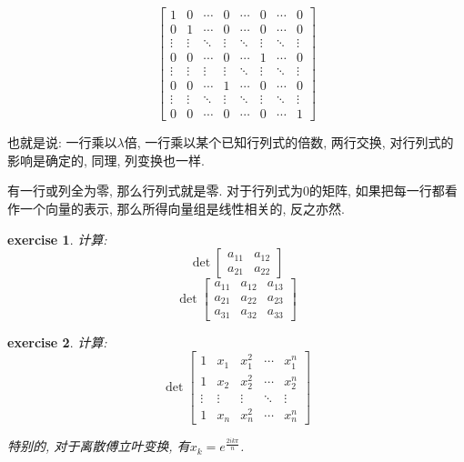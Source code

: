 \documentclass[12pt]{ctexbook}
\numberwithin{definition}{section}
\numberwithin{theorem}{section}
\newtheorem{exercise}{exercise}
\numberwithin{exercise}{section}
\numberwithin{example}{section}
\numberwithin{lemma}{section}
\begin{document}
    \begin{equation}
        \begin{bmatrix}
            1 & 0 & \cdots & 0 & \cdots & 0 & \cdots & 0 \\
            0 & 1 & \cdots & 0 & \cdots & 0 & \cdots & 0 \\
            \vdots & \vdots & \ddots & \vdots & \ddots & \vdots & \ddots & \vdots \\
            0 & 0 & \cdots & 0 & \cdots & 1 & \cdots & 0 \\
            \vdots & \vdots & \vdots & \vdots & \ddots & \vdots & \ddots & \vdots \\
            0 & 0 & \cdots & 1 & \cdots & 0 & \cdots & 0 \\
            \vdots & \vdots & \ddots & \vdots & \ddots & \vdots & \ddots & \vdots \\
            0 & 0 & \cdots & 0 & \cdots & 0 & \cdots & 1
        \end{bmatrix}
    \end{equation}

    也就是说: 一行乘以\(\lambda\)倍, 一行乘以某个已知行列式的倍数, 两行交换, 对行列式的影响是确定的, 同理, 列变换也一样.

    有一行或列全为零, 那么行列式就是零. 对于行列式为\(0\)的矩阵, 如果把每一行都看作一个向量的表示, 那么所得向量组是线性相关的, 反之亦然.
    \begin{exercise}
        计算:
        \begin{equation}
            \det \begin{bmatrix}
                a_{11} & a_{12} \\
                a_{21} & a_{22}
            \end{bmatrix}
        \end{equation}
        \begin{equation}
            \det \begin{bmatrix}
                a_{11} & a_{12} & a_{13} \\
                a_{21} & a_{22} & a_{23} \\
                a_{31} & a_{32} & a_{33}
             \end{bmatrix}
        \end{equation}
    \end{exercise}

    \begin{exercise}
        计算: 
        \begin{equation}
            \det \begin{bmatrix}
                1 & x_1 & x_1^2 & \cdots & x_1^n \\
                1 & x_2 & x_2^2 & \cdots & x_2^n \\
                \vdots & \vdots & \vdots & \ddots & \vdots \\
                1 & x_n & x_n^2 & \cdots & x_n^n
            \end{bmatrix}
        \end{equation}

        特别的, 对于离散傅立叶变换, 有\(x_k = e^{\frac{2ik\pi}{n}}\).
    \end{exercise}
\end{document}
